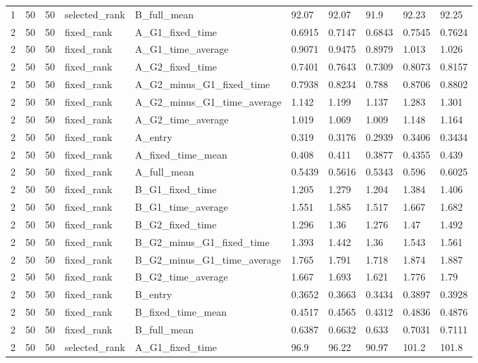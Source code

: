 \begin{longtable}{llllllllll}
1 & 50 & 50 & selected\_rank & B\_full\_mean & 92.07 & 92.07 & 91.9 & 92.23 & 92.25 \\
2 & 50 & 50 & fixed\_rank & A\_G1\_fixed\_time & 0.6915 & 0.7147 & 0.6843 & 0.7545 & 0.7624 \\
2 & 50 & 50 & fixed\_rank & A\_G1\_time\_average & 0.9071 & 0.9475 & 0.8979 & 1.013 & 1.026 \\
2 & 50 & 50 & fixed\_rank & A\_G2\_fixed\_time & 0.7401 & 0.7643 & 0.7309 & 0.8073 & 0.8157 \\
2 & 50 & 50 & fixed\_rank & A\_G2\_minus\_G1\_fixed\_time & 0.7938 & 0.8234 & 0.788 & 0.8706 & 0.8802 \\
2 & 50 & 50 & fixed\_rank & A\_G2\_minus\_G1\_time\_average & 1.142 & 1.199 & 1.137 & 1.283 & 1.301 \\
2 & 50 & 50 & fixed\_rank & A\_G2\_time\_average & 1.019 & 1.069 & 1.009 & 1.148 & 1.164 \\
2 & 50 & 50 & fixed\_rank & A\_entry & 0.319 & 0.3176 & 0.2939 & 0.3406 & 0.3434 \\
2 & 50 & 50 & fixed\_rank & A\_fixed\_time\_mean & 0.408 & 0.411 & 0.3877 & 0.4355 & 0.439 \\
2 & 50 & 50 & fixed\_rank & A\_full\_mean & 0.5439 & 0.5616 & 0.5343 & 0.596 & 0.6025 \\
2 & 50 & 50 & fixed\_rank & B\_G1\_fixed\_time & 1.205 & 1.279 & 1.204 & 1.384 & 1.406 \\
2 & 50 & 50 & fixed\_rank & B\_G1\_time\_average & 1.551 & 1.585 & 1.517 & 1.667 & 1.682 \\
2 & 50 & 50 & fixed\_rank & B\_G2\_fixed\_time & 1.296 & 1.36 & 1.276 & 1.47 & 1.492 \\
2 & 50 & 50 & fixed\_rank & B\_G2\_minus\_G1\_fixed\_time & 1.393 & 1.442 & 1.36 & 1.543 & 1.561 \\
2 & 50 & 50 & fixed\_rank & B\_G2\_minus\_G1\_time\_average & 1.765 & 1.791 & 1.718 & 1.874 & 1.887 \\
2 & 50 & 50 & fixed\_rank & B\_G2\_time\_average & 1.667 & 1.693 & 1.621 & 1.776 & 1.79 \\
2 & 50 & 50 & fixed\_rank & B\_entry & 0.3652 & 0.3663 & 0.3434 & 0.3897 & 0.3928 \\
2 & 50 & 50 & fixed\_rank & B\_fixed\_time\_mean & 0.4517 & 0.4565 & 0.4312 & 0.4836 & 0.4876 \\
2 & 50 & 50 & fixed\_rank & B\_full\_mean & 0.6387 & 0.6632 & 0.633 & 0.7031 & 0.7111 \\
2 & 50 & 50 & selected\_rank & A\_G1\_fixed\_time & 96.9 & 96.22 & 90.97 & 101.2 & 101.8 \\

\end{longtable}
